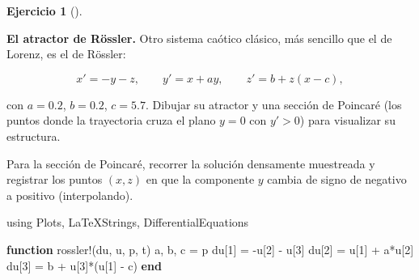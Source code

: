 \documentclass[
  spanish,
  a4paper,
]{scrreport}
\newenvironment{Shaded}{\begin{snugshade}}{\end{snugshade}}
\newcommand{\BuiltInTok}[1]{\textcolor[rgb]{0.00,0.23,0.31}{#1}}
\newcommand{\FloatTok}[1]{\textcolor[rgb]{0.68,0.00,0.00}{#1}}
\newcommand{\FunctionTok}[1]{\textcolor[rgb]{0.28,0.35,0.67}{#1}}
\newcommand{\ImportTok}[1]{\textcolor[rgb]{0.00,0.46,0.62}{#1}}
\newcommand{\KeywordTok}[1]{\textcolor[rgb]{0.00,0.23,0.31}{\textbf{#1}}}
\newcommand{\NormalTok}[1]{\textcolor[rgb]{0.00,0.23,0.31}{#1}}
\newcommand{\OperatorTok}[1]{\textcolor[rgb]{0.37,0.37,0.37}{#1}}
\theoremstyle{definition}
\newtheorem{exercise}{Ejercicio}[chapter]
\theoremstyle{remark}
\begin{document}
\begin{exercise}[]\protect\hypertarget{exr-rossler}{}\label{exr-rossler}

\textbf{El atractor de Rössler.} Otro sistema caótico clásico, más
sencillo que el de Lorenz, es el de Rössler:

\[
x' = -y - z, \qquad y' = x + a y, \qquad z' = b + z(x - c),
\]

con \(a = 0.2\), \(b = 0.2\), \(c = 5.7\). Dibujar su atractor y una
sección de Poincaré (los puntos donde la trayectoria cruza el plano
\(y = 0\) con \(y' > 0\)) para visualizar su estructura.

\begin{tcolorbox}[enhanced jigsaw, arc=.35mm, bottomrule=.15mm, bottomtitle=1mm, breakable, colback=white, colbacktitle=quarto-callout-note-color!10!white, colframe=quarto-callout-note-color-frame, coltitle=black, left=2mm, leftrule=.75mm, opacityback=0, opacitybacktitle=0.6, rightrule=.15mm, title=\textcolor{quarto-callout-note-color}{\faInfo}\hspace{0.5em}{Ayuda}, titlerule=0mm, toprule=.15mm, toptitle=1mm]

Para la sección de Poincaré, recorrer la solución densamente muestreada
y registrar los puntos \((x, z)\) en que la componente \(y\) cambia de
signo de negativo a positivo (interpolando).

\end{tcolorbox}

\begin{tcolorbox}[enhanced jigsaw, arc=.35mm, bottomrule=.15mm, bottomtitle=1mm, breakable, colback=white, colbacktitle=quarto-callout-tip-color!10!white, colframe=quarto-callout-tip-color-frame, coltitle=black, left=2mm, leftrule=.75mm, opacityback=0, opacitybacktitle=0.6, rightrule=.15mm, title=\textcolor{quarto-callout-tip-color}{\faLightbulb}\hspace{0.5em}{Solución}, titlerule=0mm, toprule=.15mm, toptitle=1mm]

\begin{Shaded}
\begin{Highlighting}[]
\ImportTok{using} \BuiltInTok{Plots}\NormalTok{, }\BuiltInTok{LaTeXStrings}\NormalTok{, }\BuiltInTok{DifferentialEquations}

\KeywordTok{function} \FunctionTok{rossler!}\NormalTok{(du, u, p, t)}
\NormalTok{    a, b, c }\OperatorTok{=}\NormalTok{ p}
\NormalTok{    du[}\FloatTok{1}\NormalTok{] }\OperatorTok{=} \OperatorTok{{-}}\NormalTok{u[}\FloatTok{2}\NormalTok{] }\OperatorTok{{-}}\NormalTok{ u[}\FloatTok{3}\NormalTok{]}
\NormalTok{    du[}\FloatTok{2}\NormalTok{] }\OperatorTok{=}\NormalTok{ u[}\FloatTok{1}\NormalTok{] }\OperatorTok{+}\NormalTok{ a}\OperatorTok{*}\NormalTok{u[}\FloatTok{2}\NormalTok{]}
\NormalTok{    du[}\FloatTok{3}\NormalTok{] }\OperatorTok{=}\NormalTok{ b }\OperatorTok{+}\NormalTok{ u[}\FloatTok{3}\NormalTok{]}\FunctionTok{*}\NormalTok{(u[}\FloatTok{1}\NormalTok{] }\OperatorTok{{-}}\NormalTok{ c)}
\KeywordTok{end}


\end{Highlighting}
\end{Shaded}
\end{tcolorbox}
\end{exercise}
\end{document}
